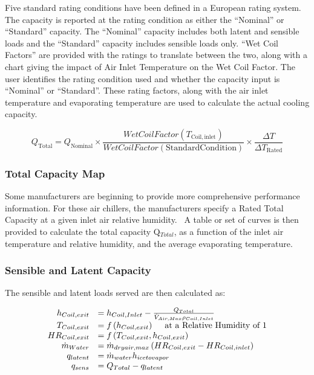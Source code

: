 Five standard rating conditions have been defined in a European rating system. The capacity is reported at the rating condition as either the ``Nominal'' or ``Standard'' capacity. The ``Nominal'' capacity includes both latent and sensible loads and the ``Standard'' capacity includes sensible loads only. ``Wet Coil Factors'' are provided with the ratings to translate between the two, along with a chart giving the impact of Air Inlet Temperature on the Wet Coil Factor. The user identifies the rating condition used and whether the capacity input is ``Nominal'' or ``Standard''. These rating factors, along with the air inlet temperature and evaporating temperature are used to calculate the actual cooling capacity.

\begin{equation}
{Q_{{\mathrm{Total}}}} = {Q_{{\mathrm{Nominal}}}} \times \frac{{WetCoilFactor({T_{{\mathrm{Coil,inlet}}}})}}{{WetCoilFactor({\mathrm{Standard Condition}})}} \times \frac{{\Delta T}}{{\Delta {T_{{\mathrm{Rated}}}}}}
\end{equation}

\subsubsection{Total Capacity Map}\label{total-capacity-map}

Some manufacturers are beginning to provide more comprehensive performance information. For these air chillers, the manufacturers specify a Rated Total Capacity at a given inlet air relative humidity.~ A table or set of curves is then provided to calculate the total capacity Q\(_{Total}\), as a function of the inlet air temperature and relative humidity, and the average evaporating temperature.

\subsubsection{Sensible and Latent Capacity}\label{sensible-and-latent-capacity}

The sensible and latent loads served are then calculated as:

\begin{equation}
  \begin{array}{rl}
      h_{Coil,exit} &= h_{Coil,Inlet} - \frac{Q_{Total}}{\dot{V}_{Air,Max} \rho_{Coil,Inlet}} \\
      T_{Coil,exit} &= f\left(h_{Coil,exit}\right)~~~~\text{at a Relative Humidity of 1} \\
     HR_{Coil,exit} &= f\left(T_{Coil,exit},h_{Coil,exit}\right) \\
    \dot{m}_{Water} &= \dot{m}_{dryair,max} \left(HR_{Coil,exit} - HR_{Coil,inlet}\right) \\
         q_{latent} &= \dot{m}_{water} h_{icetovapor} \\
           q_{sens} &= Q_{Total} - q_{latent}
  \end{array}
\end{equation}

